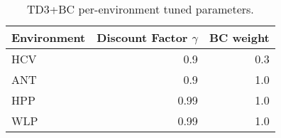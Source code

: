 \begin{table}[ht]
    \label{tab:}
    \begin{center}
 \caption{TD3+BC per-environment tuned parameters.}
    \begin{small}
    \begin{adjustbox}{max width=\columnwidth}
		\begin{tabular}{l|rr}
		\toprule
	\textbf{Environment} & \textbf{Discount Factor $\gamma$} & \textbf{BC weight} \\
\midrule
HCV & 0.9 & 0.3 \\
ANT & 0.9 & 1.0 \\
HPP & 0.99 & 1.0 \\
WLP & 0.99 & 1.0 \\
\bottomrule
\end{tabular}
        \end{adjustbox}
    \end{small}
    \end{center}
    \vskip -0.1in
\end{table}
    